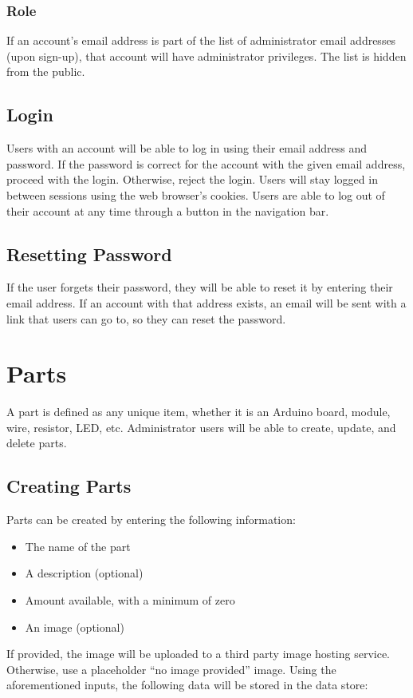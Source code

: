 \documentclass[12pt, letterpaper]{article}
\begin{document}
\subsubsection{Role}
If an account's email address is part of the list of administrator email addresses (upon sign-up), that account will have administrator privileges. The list is hidden from the public.

\subsection{Login}
Users with an account will be able to log in using their email address and password. If the password is correct for the account with the given email address, proceed with the login. Otherwise, reject the login. Users will stay logged in between sessions using the web browser's cookies. Users are able to log out of their account at any time through a button in the navigation bar.

\subsection{Resetting Password}
If the user forgets their password, they will be able to reset it by entering their email address. If an account with that address exists, an email will be sent with a link that users can go to, so they can reset the password.

\section{Parts}
A part is defined as any unique item, whether it is an Arduino board, module, wire, resistor, LED, etc. Administrator users will be able to create, update, and delete parts. 

\subsection{Creating Parts}
Parts can be created by entering the following information:

\begin{itemize}
  \item The name of the part
  \item A description (optional)
  \item Amount available, with a minimum of zero
  \item An image (optional)
\end{itemize}

If provided, the image will be uploaded to a third party image hosting service. Otherwise, use a placeholder ``no image provided'' image. Using the aforementioned inputs, the following data will be stored in the data store:
\end{document}
